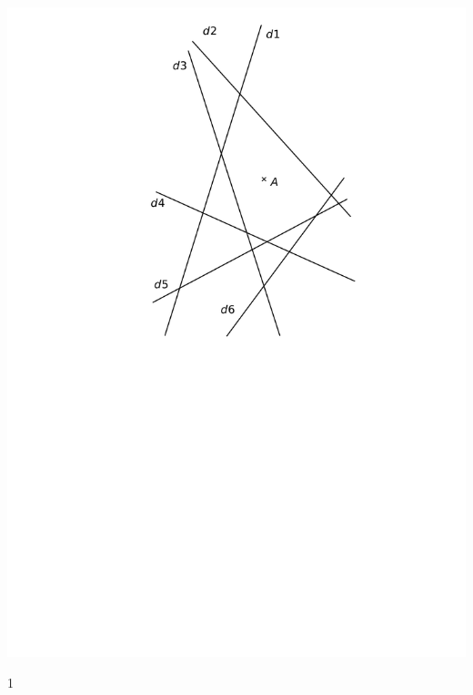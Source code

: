 \documentclass[a4paper,11pt]{report}
\begin{document}
\begin{exop}
{\begin{minipage}[t]{0.53\textwidth}{
\vspace{0pt}
\begin{center}
\includegraphics[scale=0.8]{media/es-11/13-15}
\end{center}	
}
\end{minipage}
}
{1}
\end{exop}

%
\end{document}

